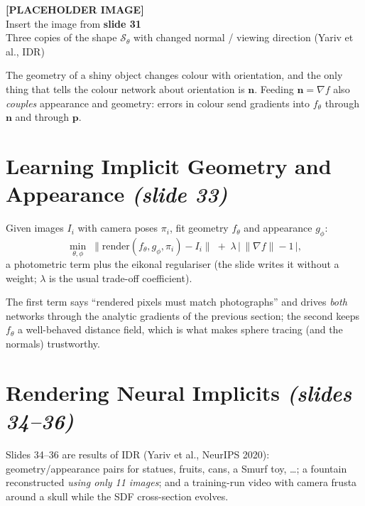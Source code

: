 \documentclass[11pt,a4paper]{article}
\newcommand{\bp}{{\bm{p}}}
\newcommand{\bn}{{\bm{n}}}
\newcommand{\slideimg}[2]{%
  \begin{center}
  \begin{tcolorbox}[enhanced,colback=gray!8,colframe=gray!8,width=0.92\linewidth,
    halign=center,valign=center,height=3.4cm,
    overlay={\draw[dashed,gray!70,thick] (frame.south west) rectangle (frame.north east);}]
  \textbf{[PLACEHOLDER IMAGE]}\\ Insert the image from \textbf{#1}\\ {\small #2}
  \end{tcolorbox}
  \end{center}}
\begin{document}
\slideimg{slide 31}{Three copies of the shape $\mathcal S_\theta$ with changed normal / viewing direction (Yariv et al., IDR)}

\begin{intuition}
The geometry of a shiny object changes colour with orientation, and the only thing that tells the colour network
about orientation is $\bn$. Feeding $\bn=\nabla f$ also \emph{couples} appearance and geometry: errors in colour send
gradients into $f_\theta$ through $\bn$ and through $\bp$.
\end{intuition}

\section{Learning Implicit Geometry and Appearance \emph{(slide 33)}}
Given images $I_i$ with camera poses $\pi_i$, fit geometry $f_\theta$ and appearance $g_\phi$:
\begin{equation}\label{eq:loss}
\min_{\theta,\phi}\;\bigl\|\mathrm{render}(f_\theta,g_\phi,\pi_i)-I_i\bigr\|\;+\;\lambda\,\bigl|\,\|\nabla f\|-1\,\bigr| ,
\end{equation}
a photometric term plus the eikonal regulariser (the slide writes it without a weight; $\lambda$ is the
usual trade-off coefficient).

\begin{intuition}
The first term says ``rendered pixels must match photographs'' and drives \emph{both} networks through the
analytic gradients of the previous section; the second keeps $f_\theta$ a well-behaved distance field, which is what makes
sphere tracing (and the normals) trustworthy.
\end{intuition}

\section{Rendering Neural Implicits \emph{(slides 34--36)}}
Slides 34--36 are results of IDR (Yariv et al., NeurIPS 2020): geometry/appearance pairs for statues, fruits, cans, a
Smurf toy, \dots{}; a fountain reconstructed \emph{using only 11 images}; and a training-run video with camera frusta
around a skull while the SDF cross-section evolves.
\end{document}
